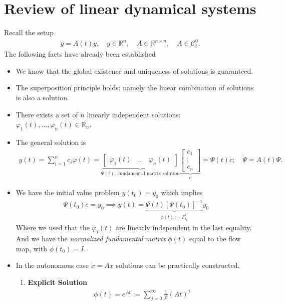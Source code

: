 \section{Review of linear dynamical systems}
Recall the setup
\begin{align}
	\dot{{y} } = {A} (t){y}, \quad {y} \in \mathbb{R}^{n}, \quad {A} \in \mathbb{R}^{n \times n}, \quad {A} \in \mathcal{C}^{0}_{t}.
\end{align}
The following facts have already been established
\begin{itemize}
	\item We know that the global existence and uniqueness of solutions is guaranteed. 
	\item The superposition principle holds; namely the linear combination of solutions is also a solution.
	\item There exists a set of $n$ linearly independent solutions: $\varphi_1(t), \ldots, \varphi_n(t) \in \mathbb{R}_{n}$.
	\item The general solution is
		\begin{align}
			y(t) = \sum_{i=1}^{n} c_i \varphi(t) =
			\underbrace{\begin{bmatrix}
				\varphi_1(t) & \ldots & \varphi_n(t)
		\end{bmatrix}}_{\Psi(t):  \textrm{ fundamental matrix solution} }
		\underbrace{\begin{bmatrix}
			c_1 \\ \vdots \\ c_n
	\end{bmatrix}}_{c}
	= \Psi(t) {c}; \quad \dot{\Psi} = A(t) \Psi.			
		\end{align}
	\item We have the initial value problem ${y} (t_0) = {y} _0$ which implies
		\begin{align}
			\Psi(t_0) {c} = {y} _0 \implies {y} (t) = \underbrace{\Psi(t) \left[\Psi(t_0)\right]^{-1}}_{\phi(t):= F_{t_0}^{t}}{y} _0 
		\end{align}
		Where we used that the $\varphi_i(t)$ are linearly independent in the last equality. And we have the \emph{normalized fundamental matrix} $\phi(t)$ equal to the flow map, with $\phi(t_0)={I} $.
	\item In the autonomous case $\dot{{x} }= {A} {x} $ solutions can be practically constructed.
	\begin{enumerate} 
		\item \textbf{Explicit Solution} 
		\begin{align}
			\phi(t) = e^{{A} t} := \sum_{j=0}^{\infty } \frac{1}{j!} ({A} t)^{j}

\end{align}
\end{enumerate}
\end{itemize}
